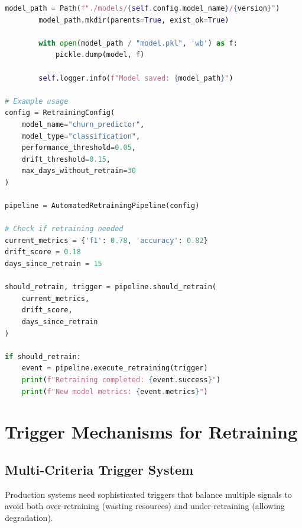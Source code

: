 \begin{lstlisting}[language=Python, caption=Complete Automated Retraining Pipeline]
        model_path = Path(f"./models/{self.config.model_name}/{version}")
        model_path.mkdir(parents=True, exist_ok=True)

        with open(model_path / "model.pkl", 'wb') as f:
            pickle.dump(model, f)

        self.logger.info(f"Model saved: {model_path}")

# Example usage
config = RetrainingConfig(
    model_name="churn_predictor",
    model_type="classification",
    performance_threshold=0.05,
    drift_threshold=0.15,
    max_days_without_retrain=30
)

pipeline = AutomatedRetrainingPipeline(config)

# Check if retraining needed
current_metrics = {'f1': 0.78, 'accuracy': 0.82}
drift_score = 0.18
days_since_retrain = 15

should_retrain, trigger = pipeline.should_retrain(
    current_metrics,
    drift_score,
    days_since_retrain
)

if should_retrain:
    event = pipeline.execute_retraining(trigger)
    print(f"Retraining completed: {event.success}")
    print(f"New model metrics: {event.metrics}")
\end{lstlisting}

\section{Trigger Mechanisms for Retraining}

\subsection{Multi-Criteria Trigger System}

Production systems need sophisticated triggers that balance multiple signals to avoid both over-retraining (wasting resources) and under-retraining (allowing degradation).

